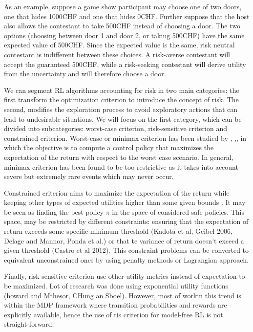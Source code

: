 As an example, suppose a game show participant may choose one of two doors, one that hides 1000CHF
and one that hides 0CHF. Further suppose that the host also allows the contestant to 
take 500CHF instead of choosing a door. The two options (choosing between door 1 and door 2, or taking 500CHF)
have the same expected value of 500CHF.
Since the expected value is the same, risk neutral contestant is indifferent between these choices. 
A risk-averse contestant will accept the guaranteed 500CHF, while a risk-seeking
contestant will derive utility from the uncertainty and will therefore choose a door. 

We can segment RL algorithms accounting for risk in two main categories: the first transform 
the optimization criterion to introduce the concept of risk. The second, modifies the exploration process to avoid
exploratory actions that can lead to undesirable situations.
We will focus on the first category, which can be divided into subcategories: worst-case criterion, risk-sensitive criterion
and constrained criterion.
Worst-case or minimax criterion has been studied by \citep{Heger1994}, \citep{Coraluppi1999},\citep{Coraluppi1997},
in which the objective is to compute a control policy that maximizes the expectation of the return
with respect to the worst case scenario.
In general, minimax criterion has been found to be too restrictive as it takes into
account severe but extremely rare events which may never occur.

Constrained criterion  aims to maximize the expectation of the return while keeping other types of expected
utilities higher than some given bounds \citep{Altman1993}. It may be seen as finding the best policy $\pi$
in the space of considered safe policies. This space, may be restricted by different constraints: ensuring that
the expectation of return exceeds some specific minimum threshold  (Kadota et al, Geibel 2006, Delage and Mannor, Ponda et al.)
or that te variance of return doesn't exceed a given threshold (Castro et al 2012). This constraint problems
can be converted to equivalent unconstrained ones by using penalty methods or Lagrangian approach.

Finally, risk-sensitive criterion use other utility metrics instead of expectation to be maximized.
Lot of research was done using exponential utility functions (howard and Mthesor, CHung an Sboel). 
However, most of workin this trend is within the MDP framework where transition
probabilities and rewards are explicitly available, hence the use of tis criterion
for model-free RL is not straight-forward.


